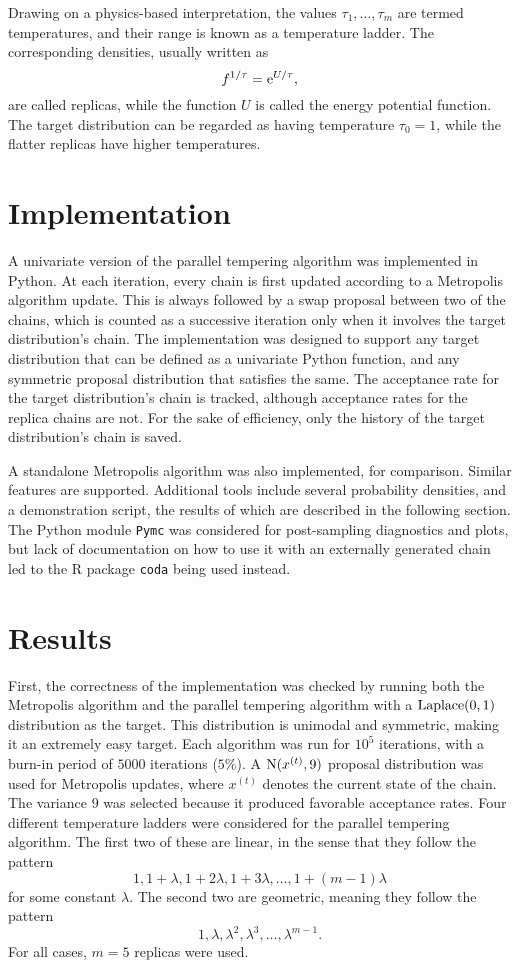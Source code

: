 Drawing on a physics-based interpretation, the values $\tau_1, \ldots, \tau_m$
are termed temperatures, and their range is known as a temperature ladder.
The corresponding densities, usually written as
    \[
    f^{1/\tau} = \operatorname{e}^{U / \tau},
    \]
are called replicas, while the function $U$ is called the energy potential
function. 
The target distribution can be regarded as having temperature $\tau_0 = 1$,
while the flatter replicas have higher temperatures.

\chapter*{Implementation}
A univariate version of the parallel tempering algorithm was implemented in
Python.
At each iteration, every chain is first updated according to a Metropolis
algorithm update. 
This is always followed by a swap proposal between two of the chains,
which is counted as a successive iteration only when it involves the target
distribution's chain.
The implementation was designed to support any target distribution that can
be defined as a univariate Python function, and any symmetric proposal
distribution that satisfies the same.
The acceptance rate for the target distribution's chain is tracked,
although acceptance rates for the replica chains are not.
For the sake of efficiency, only the history of the target distribution's
chain is saved.

A standalone Metropolis algorithm was also implemented, for comparison.
Similar features are supported. Additional tools include several probability
densities, and a demonstration script, 
the results of which are described in the following section.
The Python module \texttt{Pymc} was considered for post-sampling diagnostics
and plots, but lack of documentation on how to use it with an externally
generated chain led to the R package \texttt{coda} being used instead.

\chapter*{Results}

First, the correctness of the implementation was checked by running both the 
Metropolis algorithm and the parallel tempering algorithm with a
$\operatorname{Laplace(0, 1)}$ distribution as the target.
This distribution is unimodal and symmetric, making it an extremely easy
target.
Each algorithm was run for $10^5$ iterations, with a burn-in period of
$5000$ iterations ($5$\%).
A $\operatorname{N}(x^{(t)}, 9)$ proposal distribution was used for Metropolis updates,
where $x^{(t)}$ denotes the current state of the chain.
The variance $9$ was selected because it produced favorable acceptance rates.
Four different temperature ladders were considered for the parallel
tempering algorithm.
The first two of these are linear, in the sense that they follow the pattern
    \[
    1, 1 + \lambda, 1 + 2\lambda, 1 + 3\lambda, \ldots, 1 + (m - 1)\lambda
    \]
for some constant $\lambda$.
The second two are geometric, meaning they follow the pattern
    \[
    1, \lambda, \lambda^2, \lambda^3, \ldots, \lambda^{m - 1}.
    \]
For all cases, $m = 5$ replicas were used.

